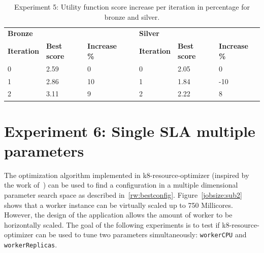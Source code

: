 \begin{table}[H]
\centering
\caption{Experiment 5: Utility function score increase per iteration in percentage for bronze and silver.}
\label{tbl:exp5-increase}
\begin{tabular}{lllllll}
\textbf{Bronze}                          & \textbf{}                                & \textbf{}                                 & \textbf{}                      & \textbf{Silver}                         & \textbf{}                                & \textbf{}                                 \\ \cline{1-3} \cline{5-7} 
\multicolumn{1}{|l|}{\textbf{Iteration}} & \multicolumn{1}{l|}{\textbf{Best score}} & \multicolumn{1}{l|}{\textbf{Increase \%}} & \multicolumn{1}{l|}{\textbf{}} & \multicolumn{1}{l|}{\textbf{Iteration}} & \multicolumn{1}{l|}{\textbf{Best score}} & \multicolumn{1}{l|}{\textbf{Increase \%}} \\ \cline{1-3} \cline{5-7} 
\multicolumn{1}{|l|}{0}                  & \multicolumn{1}{l|}{2.59}                & \multicolumn{1}{l|}{0}                    & \multicolumn{1}{l|}{}          & \multicolumn{1}{l|}{0}                  & \multicolumn{1}{l|}{2.05}                & \multicolumn{1}{l|}{0}                    \\ \cline{1-3} \cline{5-7} 
\multicolumn{1}{|l|}{1}                  & \multicolumn{1}{l|}{2.86}                & \multicolumn{1}{l|}{10}                   & \multicolumn{1}{l|}{}          & \multicolumn{1}{l|}{1}                  & \multicolumn{1}{l|}{1.84}                & \multicolumn{1}{l|}{-10}                  \\ \cline{1-3} \cline{5-7} 
\multicolumn{1}{|l|}{2}                  & \multicolumn{1}{l|}{3.11}                & \multicolumn{1}{l|}{9}                    & \multicolumn{1}{l|}{}          & \multicolumn{1}{l|}{2}                  & \multicolumn{1}{l|}{2.22}                & \multicolumn{1}{l|}{8}                   \\ \cline{1-3} \cline{5-7} 
\end{tabular}
\end{table}

\section{Experiment 6:  Single SLA multiple parameters}
The optimization algorithm implemented in k8-resource-optimizer (inspired by the work of~\cite{zhu2017bestconfig}) can be used to find a configuration in a multiple dimensional parameter search space as described in~\ref{rw:bestconfig}. Figure~\ref{jobsize:sub2} shows that a worker instance can be virtually scaled up to 750 Millicores. However, the  design of the application allows the amount of worker to be horizontally scaled. The goal of the following experiments is to test if k8-resource-optimizer can be used to tune two parameters simultaneously: \texttt{workerCPU} and \texttt{workerReplicas}.
